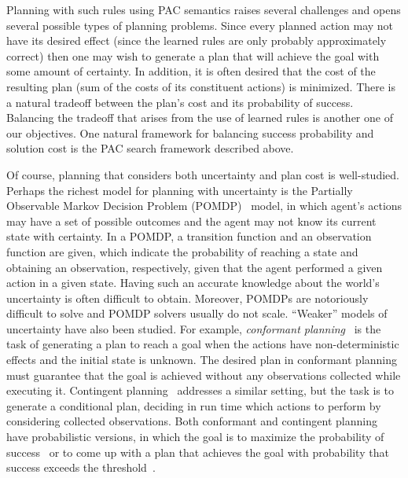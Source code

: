 \documentclass[12pt]{article}
\newcommand{\note}[1]{\textbf{\textit{#1}}}
\begin{document}
Planning with such rules using PAC semantics raises several challenges and opens several possible types of planning problems.
Since every planned action may not have its desired effect (since the learned rules are only probably approximately correct)
then one may wish to generate a plan that will achieve the goal with some amount of certainty. In addition, it is often desired that the cost of the resulting plan (sum of the costs of its constituent actions) is minimized. There is a natural tradeoff between the plan's cost  and its probability of success. 
Balancing the tradeoff that arises from the use of learned rules is another one of our objectives. One natural framework for balancing success probability and solution cost is the PAC search framework described above. 
 





Of course, planning that considers both uncertainty and plan cost is well-studied. Perhaps the richest model for planning with uncertainty is the Partially Observable Markov Decision Problem (POMDP)~\cite{cassandra1994acting}
model, in which agent's actions may have a set of possible outcomes and the agent may not know its current state with certainty. 
In a POMDP, a transition function and an observation function are given, which indicate the probability of reaching a state and obtaining an observation, respectively, given that the agent performed a given action in a given state. Having such an accurate knowledge about the world's uncertainty is often difficult to obtain. Moreover, POMDPs are notoriously difficult to solve and POMDP solvers usually do not scale. %
``Weaker'' models of uncertainty have also been studied. 
For example, {\em conformant planning}~\cite{hoffmann2006conformant,cimatti2004conformant,cimatti1999conformant} is the task of generating a plan to reach a goal when the actions have non-deterministic effects
and the initial state is unknown. The desired plan in conformant planning must guarantee that the goal is achieved without any observations collected while executing it. Contingent planning~\cite{hoffmann2005contingent,majercik2003contingent} addresses a similar setting, but the task is to generate a conditional plan, deciding in run time which actions to perform by considering collected observations. 
Both conformant and contingent planning have probabilistic versions,
in which the goal is to maximize the probability of success~\cite{blum1999probabilistic,taig2015compilation,markou2016cost} 
or to come up with a plan that achieves the goal with probability that success exceeds the threshold~\cite{kushmerick1995algorithm}.
\end{document}
